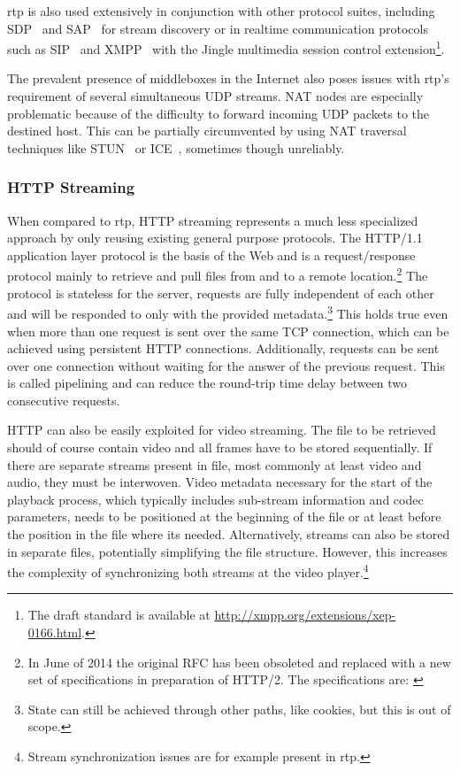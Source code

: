 \gls{rtp} is also used extensively in conjunction with other protocol suites, including \gls{SDP}~\cite{rfc2327} and \gls{SAP}~\cite{rfc2974} for stream discovery or in realtime communication protocols such as \gls{SIP}~\cite{rfc3261} and \gls{XMPP}~\cite{rfc6120,rfc6121} with the Jingle multimedia session control extension\footnote{The draft standard is available at \url{http://xmpp.org/extensions/xep-0166.html}.}.

The prevalent presence of middleboxes in the Internet also poses issues with \Gls{rtp}'s requirement of several simultaneous \gls{UDP} streams. \gls{NAT} nodes are especially problematic because of the difficulty to forward incoming \gls{UDP} packets to the destined host. This can be partially circumvented by using \gls{NAT} traversal techniques like \gls{STUN}~\cite{rfc5389} or \gls{ICE}~\cite{rfc5245}, sometimes though unreliably.


\subsubsection{\texorpdfstring{\acrshort{HTTP}}{HTTP} Streaming}

When compared to \gls{rtp}, \gls{HTTP} streaming represents a much less specialized approach by only reusing existing general purpose protocols. The \gls{HTTP}/1.1~\autocite{rfc2616} application layer protocol is the basis of the Web and is a request/response protocol mainly to retrieve and pull files from and to a remote location.\footnote{In June of 2014 the original \acrshort{RFC} has been obsoleted and replaced with a new set of specifications in preparation of \gls{HTTP}/2. The specifications are: \autocite{rfc7230,rfc7231,rfc7232,rfc7233,rfc7234,rfc7235,rfc7236,rfc7237,rfc7238,rfc7239}} The protocol is stateless for the server, requests are fully independent of each other and will be responded to only with the provided metadata.\footnote{State can still be achieved through other paths, like cookies, but this is out of scope.} This holds true even when more than one request is sent over the same \gls{TCP} connection, which can be achieved using persistent \gls{HTTP} connections. Additionally, requests can be sent over one connection without waiting for the answer of the previous request. This is called pipelining and can reduce the round-trip time delay between two consecutive requests.

\gls{HTTP} can also be easily exploited for video streaming. The file to be retrieved should of course contain video and all frames have to be stored sequentially. If there are separate streams present in file, most commonly at least video and audio, they must be interwoven. Video metadata necessary for the start of the playback process, which typically includes sub-stream information and codec parameters, needs to be positioned at the beginning of the file or at least before the position in the file where its needed. Alternatively, streams can also be stored in separate files, potentially simplifying the file structure. However, this increases the complexity of synchronizing both streams at the video player.\footnote{Stream synchronization issues are for example present in \gls{rtp}.}

